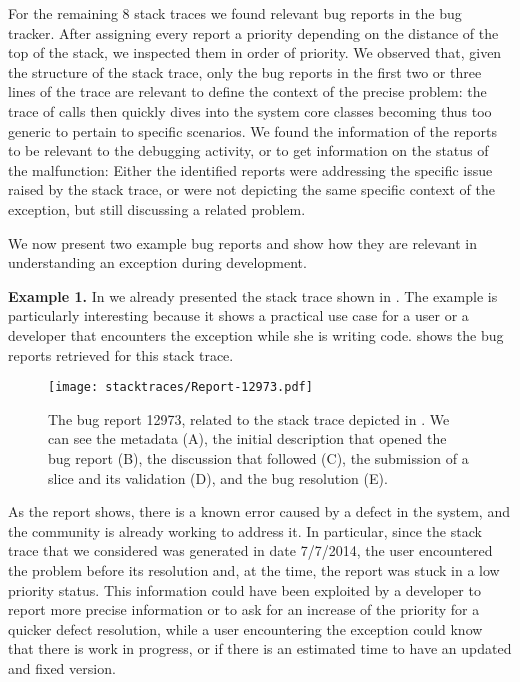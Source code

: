 For the remaining 8 stack traces we found relevant bug reports in the bug tracker. After assigning every report a priority depending on the distance of the top of the stack, we inspected them in order of priority. We observed that, given the structure of the stack trace, only the bug reports in the first two or three lines of the trace are relevant to define the context of the precise problem: the trace of calls then quickly dives into the system core classes becoming thus too generic to pertain to specific scenarios. We found the information of the reports to be relevant to the debugging activity, or to get information on the status of the malfunction: Either the identified reports were addressing the specific issue raised by the stack trace, or were not depicting the same specific context of the exception, but still discussing a related problem.

We now present two example bug reports and show how they are relevant in understanding an exception during development.

{\bf Example 1.} In  we already presented the stack trace shown in . The example is particularly interesting because it shows a practical use case for a user or a developer that encounters the exception while she is writing code.  shows the bug reports retrieved for this stack trace.

\begin{figure}[t]
\begin{center}
  \texttt{[image: stacktraces/Report-12973.pdf]}
  \caption{The bug report 12973, related to the stack trace depicted in . We can see the metadata (A), the initial description that opened the bug report (B), the discussion that followed (C), the submission of a slice and its validation (D), and the bug resolution (E).}
  \label{fig:report}
\end{center}
\end{figure}

As the report shows, there is a known error caused by a defect in the system, and the community is already working to address it. In particular, since the stack trace that we considered was generated in date 7/7/2014, the user encountered the problem before its resolution and, at the time, the report was stuck in a low priority status. This information could have been exploited by a developer to report more precise information or to ask for an increase of the priority for a quicker defect resolution, while a user encountering the exception could know that there is work in progress, or if there is an estimated time to have an updated and fixed version. 

